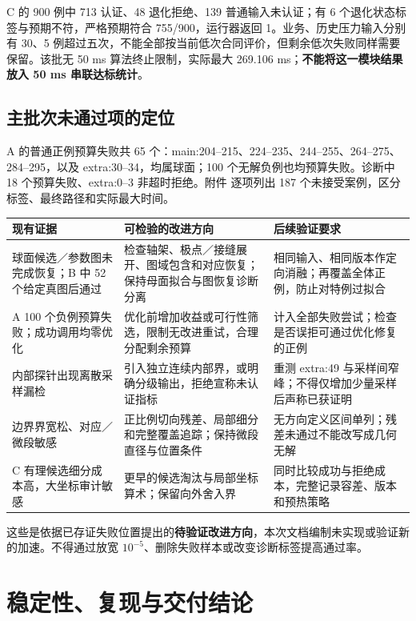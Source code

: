 \documentclass[UTF8,zihao=5,fontset=windows,a4paper]{ctexart}
\begin{document}
C 的 900 例中 713 认证、48 退化拒绝、139 普通输入未认证；有 6 个退化状态标签与预期不符，严格预期符合 755/900，运行器返回 1。业务、历史压力输入分别有 30、5 例超过五次，不能全部按当前低次合同评价，但剩余低次失败同样需要保留。该批无 50 ms 算法终止限制，实际最大 269.106 ms；\textbf{不能将这一模块结果放入 50 ms 串联达标统计}。

\subsection{主批次未通过项的定位}
A 的普通正例预算失败共 65 个：main:204--215、224--235、244--255、264--275、284--295，以及 extra:30--34，均属球面；100 个无解负例也均预算失败。诊断中 18 个预算失败、extra:0--3 非超时拒绝。附件  逐项列出 187 个未接受案例，区分标签、最终路径和实际最大时间。

\begin{center}\small\renewcommand{\arraystretch}{1.18}
\begin{tabularx}{\linewidth}{@{}p{27mm}Y Y@{}}\toprule
现有证据 & 可检验的改进方向 & 后续验证要求\\\midrule
球面候选／参数图未完成恢复；B 中 52 个给定真图后通过 & 检查轴架、极点／接缝展开、图域包含和对应恢复；保持母面拟合与图恢复诊断分离 & 相同输入、相同版本作定向消融；再覆盖全体正例，防止对特例过拟合\\
A 100 个负例预算失败；成功调用均零优化 & 优化前增加收益或可行性筛选，限制无改进重试，合理分配剩余预算 & 计入全部失败尝试；检查是否误拒可通过优化修复的正例\\
内部探针出现离散采样漏检 & 引入独立连续内部界，或明确分级输出，拒绝宣称未认证指标 & 重测 extra:49 与采样间窄峰；不得仅增加少量采样后声称已获证明\\
边界界宽松、对应／微段敏感 & 正比例切向残差、局部细分和完整覆盖追踪；保持微段直径与位置条件 & 无方向定义区间单列；残差未通过不能改写成几何无解\\
C 有理候选细分成本高，大坐标审计敏感 & 更早的候选淘汰与局部坐标算术；保留向外舍入界 & 同时比较成功与拒绝成本，完整记录容差、版本和预热策略\\\bottomrule
\end{tabularx}
\end{center}
这些是依据已存证失败位置提出的\textbf{待验证改进方向}，本次文档编制未实现或验证新的加速。不得通过放宽 $10^{-5}$、删除失败样本或改变诊断标签提高通过率。

\newpage
\section{稳定性、复现与交付结论}
\end{document}
